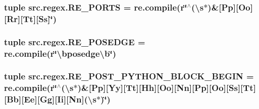 \hypertarget{namespacesrc_1_1regex_a41b4e94c5e6f0de4482981fb2a80a6cb}{
\subsubsection[{R\-E\-\_\-\-P\-O\-R\-T\-S}]{\setlength{\rightskip}{0pt plus 5cm}tuple src.\-regex.\-R\-E\-\_\-\-P\-O\-R\-T\-S = re.\-compile(r\char`\"{}$^\wedge$(\textbackslash{}s$\ast$)\&\mbox{[}Pp\mbox{]}\mbox{[}Oo\mbox{]}\mbox{[}Rr\mbox{]}\mbox{[}Tt\mbox{]}\mbox{[}Ss\mbox{]}\char`\"{})}}\label{namespacesrc_1_1regex_a41b4e94c5e6f0de4482981fb2a80a6cb}
\hypertarget{namespacesrc_1_1regex_a2ae20a6dad2c48d53bbbd98f4296ea83}{
\subsubsection[{R\-E\-\_\-\-P\-O\-S\-E\-D\-G\-E}]{\setlength{\rightskip}{0pt plus 5cm}tuple src.\-regex.\-R\-E\-\_\-\-P\-O\-S\-E\-D\-G\-E = re.\-compile(r\char`\"{}\textbackslash{}bposedge\textbackslash{}b\char`\"{})}}\label{namespacesrc_1_1regex_a2ae20a6dad2c48d53bbbd98f4296ea83}
\hypertarget{namespacesrc_1_1regex_a99a61ab957846a0c5b5a2440f272cef0}{
\subsubsection[{R\-E\-\_\-\-P\-O\-S\-T\-\_\-\-P\-Y\-T\-H\-O\-N\-\_\-\-B\-L\-O\-C\-K\-\_\-\-B\-E\-G\-I\-N}]{\setlength{\rightskip}{0pt plus 5cm}tuple src.\-regex.\-R\-E\-\_\-\-P\-O\-S\-T\-\_\-\-P\-Y\-T\-H\-O\-N\-\_\-\-B\-L\-O\-C\-K\-\_\-\-B\-E\-G\-I\-N = re.\-compile(r\char`\"{}$^\wedge$(\textbackslash{}s$\ast$)\&\mbox{[}Pp\mbox{]}\mbox{[}Yy\mbox{]}\mbox{[}Tt\mbox{]}\mbox{[}Hh\mbox{]}\mbox{[}Oo\mbox{]}\mbox{[}Nn\mbox{]}\mbox{[}Pp\mbox{]}\mbox{[}Oo\mbox{]}\mbox{[}Ss\mbox{]}\mbox{[}Tt\mbox{]}\mbox{[}Bb\mbox{]}\mbox{[}Ee\mbox{]}\mbox{[}Gg\mbox{]}\mbox{[}Ii\mbox{]}\mbox{[}Nn\mbox{]}(\textbackslash{}s$\ast$)\char`\"{})}}\label{namespacesrc_1_1regex_a99a61ab957846a0c5b5a2440f272cef0}
